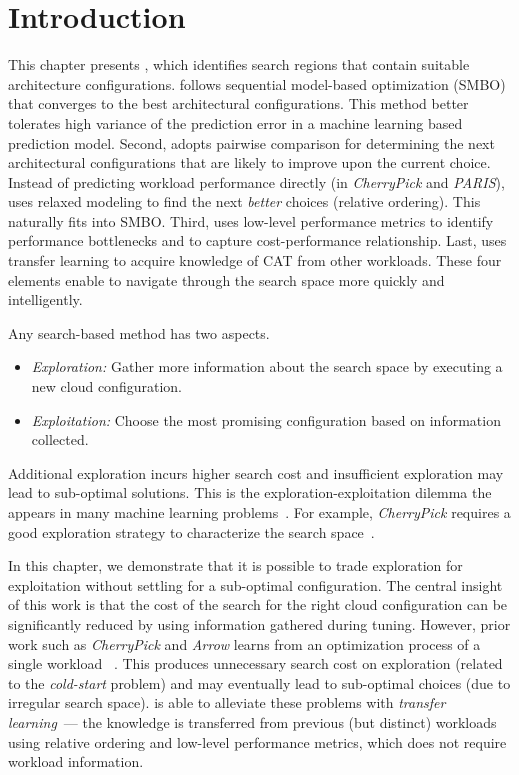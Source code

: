 \section{Introduction}
\label{sec:introduction}


This chapter presents \scout, which 
identifies search regions that contain suitable architecture configurations.
\scout follows sequential model-based optimization (SMBO)
that converges to the best architectural configurations.
This method better tolerates high variance of the prediction error
in a machine learning based prediction model.
Second, \scout adopts pairwise comparison for determining
the next architectural configurations
that are likely to improve upon the current choice.
Instead of predicting workload performance directly
(\eg in \emph{CherryPick} and \emph{PARIS}),
\scout uses relaxed modeling to find
the next \emph{better} choices (relative ordering).
This naturally fits into SMBO.
Third, \scout uses low-level performance metrics
to identify performance bottlenecks and
to capture cost-performance relationship.
Last, \scout uses transfer learning to acquire knowledge of CAT
from other workloads.
These four elements enable \scout to navigate through the search space
more quickly and intelligently.

Any search-based method has two aspects.
\vspace{-0.5em}
\begin{itemize}
    \setlength\itemsep{-0.4em}
    \item \textit{Exploration:} Gather more information about the search space by executing a new cloud configuration.
    \item \textit{Exploitation:} Choose the most promising configuration based on information collected.
\end{itemize}
\vspace{-0.5em}
Additional exploration incurs higher search cost and insufficient exploration may lead to sub-optimal solutions.
This is the exploration-exploitation dilemma the appears in many machine learning problems~\cite{kaelbling1996reinforcement}.
For example, \emph{CherryPick} requires a good exploration strategy
to characterize the search space~\cite{Alipourfard2017}.

In this chapter, we demonstrate that it is possible to
trade exploration for exploitation
without settling for a sub-optimal configuration.
The central insight of this work is that the cost of the search
for the right cloud configuration can be significantly reduced
by using information gathered during tuning.
However, prior work such as \emph{CherryPick} and \emph{Arrow}
learns from an optimization process of a single workload
~\cite{Alipourfard2017, Hsu2018Arrow}.
This produces unnecessary search cost on exploration
(related to the \emph{cold-start} problem) and
may eventually lead to sub-optimal choices (due to irregular search space).
\scout is able to alleviate these problems
with \emph{transfer learning}~\cite{pan2010survey}---
the knowledge is transferred from previous (but distinct) workloads
using relative ordering and low-level performance metrics,
which does not require workload information.

